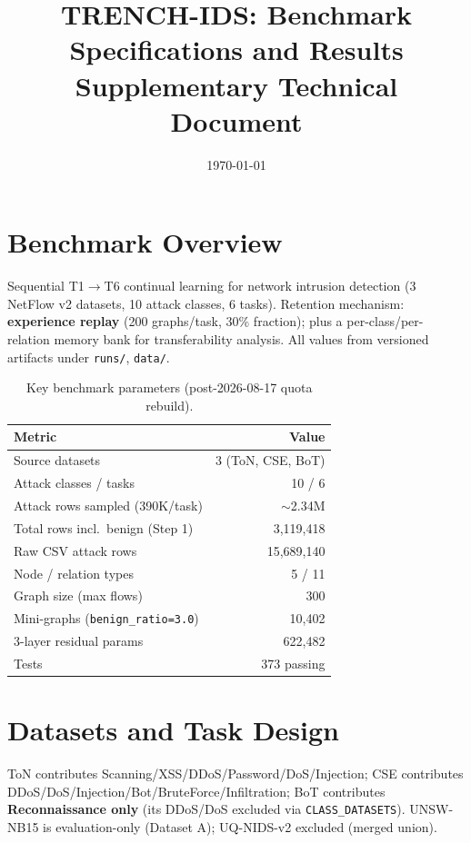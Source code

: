 \documentclass[10pt,a4paper,twocolumn]{article}
\title{TRENCH-IDS: Benchmark Specifications and Results\\Supplementary Technical Document}
\author{}
\date{\today}
\begin{document}
\maketitle

\section{Benchmark Overview}
Sequential T1$\to$T6 continual learning for network intrusion detection (3 NetFlow v2 datasets, 10 attack classes, 6 tasks). Retention mechanism: \textbf{experience replay} (200 graphs/task, 30\% fraction); plus a per-class/per-relation memory bank for transferability analysis. All values from versioned artifacts under \texttt{runs/}, \texttt{data/}.

\begin{table}[htbp]
\centering\footnotesize
\caption{Key benchmark parameters (post-2026-08-17 quota rebuild).}
\label{tab:overview}
\begin{tabular}{lr}
\toprule
Metric & Value \\
\midrule
Source datasets & 3 (ToN, CSE, BoT) \\
Attack classes / tasks & 10 / 6 \\
Attack rows sampled (390K/task) & $\sim$2.34M \\
Total rows incl.\ benign (Step 1) & 3,119,418 \\
Raw CSV attack rows & 15,689,140 \\
Node / relation types & 5 / 11 \\
Graph size (max flows) & 300 \\
Mini-graphs (\texttt{benign\_ratio=3.0}) & 10,402 \\
3-layer residual params & 622,482 \\
Tests & 373 passing \\
\bottomrule
\end{tabular}
\end{table}

\section{Datasets and Task Design}
ToN contributes Scanning/XSS/DDoS/Password/DoS/Injection; CSE contributes DDoS/DoS/Injection/Bot/BruteForce/Infiltration; BoT contributes \textbf{Reconnaissance only} (its DDoS/DoS excluded via \texttt{CLASS\_DATASETS}). UNSW-NB15 is evaluation-only (Dataset A); UQ-NIDS-v2 excluded (merged union).
\end{document}
